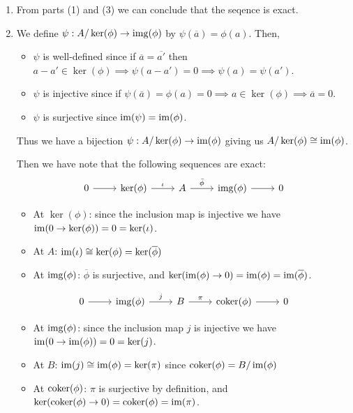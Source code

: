 \documentclass[Notebook.tex]{subfiles}
\begin{document}
\begin{solution}
\begin{enumerate}
        Thus we have a bijection $\psi: B/\im(f) \to C$ giving us $\coker(f) \iso C$. 

        
        \item From parts (1) and (3) we can conclude that the seqence is exact. 
        
        \item  We define $\psi:  A/\ker(\phi) \to \operatorname{img}(\phi)$ by $\psi(\overline{a}) = \phi(a)$. Then, 
        \begin{itemize}
            \item $\psi$ is well-defined since if $\overline{a} = \overline{a'}$ then $a-a' \in \ker(\phi) \implies \psi(a-a') = 0 \implies \psi(a) = \psi(a')$. 
            \item $\psi$ is injective since if $\psi(\overline{a}) = \phi(a) = 0 \implies a \in \ker(\phi) \implies \overline{a} = 0$. 
            \item $\psi$ is surjective since $\operatorname{im}(\psi) = \operatorname{im}(\phi)$. 
        \end{itemize}
        Thus we have a bijection $\psi: A/\ker(\phi) \to \operatorname{im}(\phi)$ giving us $A/\ker(\phi) \cong \operatorname{im}(\phi)$. 

        Then we have note that the following sequences are exact: 
        \[
        \begin{tikzcd}
        0 \arrow[r] & \ker(\phi) \arrow[r, "\iota"] & A \arrow[r, "\bar{\phi}"] & \img(\phi) \arrow[r] & 0
        \end{tikzcd}\]
        \begin{itemize}
            \item At $\ker(\phi)$: since the inclusion map is injective we have $\operatorname{im}(0\to \ker(\phi)) = 0 = \ker(\iota)$. 
            \item At $A$: $\operatorname{im}(\iota) \cong \ker(\phi) = \ker(\overline{\phi})$
            \item At $\operatorname{img}(\phi)$: $\overline{\phi}$ is surjective, and $\ker(\operatorname{im}(\phi) \to 0) = \operatorname{im}(\phi) = \operatorname{im}(\overline{\phi})$. 
        \end{itemize}

        \quad

        \[\begin{tikzcd}
        0 \arrow[r] & \img(\phi) \arrow[r, "j"] & B \arrow[r, "\pi"] & \coker(\phi) \arrow[r] & 0
        \end{tikzcd}
        \]
        \begin{itemize}
            \item At $\operatorname{img}(\phi)$: since the inclusion map $j$ is injective we have $\operatorname{im}(0\to \operatorname{im}(\phi)) = 0 = \ker(j)$. 
            \item At $B$: $\operatorname{im}(j) \cong \operatorname{im}(\phi) = \ker(\pi)$ since $\operatorname{coker}(\phi) = B/\operatorname{im}(\phi)$
            \item At $\operatorname{coker}(\phi)$: $\pi$ is surjective by definition, and $\ker(\operatorname{coker}(\phi) \to 0) = \operatorname{coker}(\phi) = \operatorname{im}(\pi)$. 
        \end{itemize}
        

\end{enumerate}
\end{solution}
\end{document}
